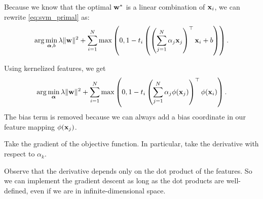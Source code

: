 \documentclass{discussion}
\begin{document}
Because we know that the optimal $\mathbf{w}^*$ is a linear combination of $\mathbf{x}_i$, we can rewrite \eqref{eq:svm_primal} as:
\begin{equation}
    \arg\min_{\boldsymbol{\alpha},b} \lambda\|\mathbf{w}\|^2 + \sum_{i=1}^{N} \max\left(0, 1 - t_i\left( \left(\sum_{j=1}^{N} \alpha_j \mathbf{x}_j\right)^\top \mathbf{x}_i + b\right)\right).
\end{equation}

Using kernelized features, we get
\begin{equation}
    \arg\min_{\boldsymbol{\alpha}} \lambda\|\mathbf{w}\|^2 + \sum_{i=1}^{N} \max\left(0, 1 - t_i \left(\sum_{j=1}^{N} \alpha_j \phi(\mathbf{x}_j)\right)^\top \phi(\mathbf{x}_i)\right).
\end{equation}
The bias term is removed because we can always add a bias coordinate in our feature mapping $\phi(\mathbf{x}_j)$.

\begin{exercise}
  Take the gradient of the objective function. In particular, take the derivative with respect to $\alpha_k$.
\end{exercise} 

Observe that the derivative depends only on the dot product of the features. So we can implement the gradient descent as long as the dot products are well-defined, even if we are in infinite-dimensional space.
\end{document}
